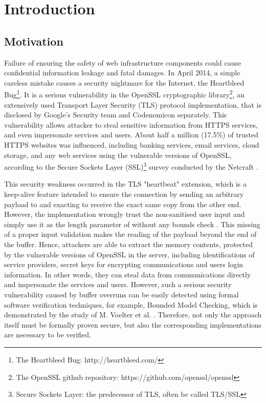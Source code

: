 
\chapter{Introduction}

\section{Motivation} \label{sec:heartbleed bug}
Failure of ensuring the safety of web infrastructure components could cause confidential information leakage and fatal damages. In April 2014, a simple careless mistake causes a security nightmare for the Internet, the Heartbleed Bug\footnote{The Heartbleed Bug: http://heartbleed.com/}. It is a serious vulnerability in the OpenSSL cryptographic library\footnote{The OpenSSL github repository: https://github.com/openssl/openssl}, an extensively used Transport Layer Security (TLS) protocol implementation, that is disclosed by Google's Security team and Codenomicon separately. This vulnerability allows attacker to steal sensitive information from HTTPS services, and even impersonate services and users. About half a million (17.5\%) of trusted HTTPS websites was influenced, including banking services, email services, cloud storage, and any web services using the vulnerable versions of OpenSSL, according to the Secure Sockets Layer (SSL)\footnote{Secure Sockets Layer: the predecessor of TLS, often be called TLS/SSL} survey conducted by the Netcraft \cite{9_heartbleed}.

This security weakness occurred in the TLS "heartbeat" extension, which is a keep-alive feature intended to ensure the connection by sending an arbitrary payload to and exacting to receive the exact same copy from the other end. However, the implementation wrongly trust the non-sanitised user input and simply use it as the length parameter of  without any bounds check \cite{6_heartbleed_bug}. This missing of a proper input validation makes the reading of the payload beyond the end of the buffer. Hence, attackers are able to extract the memory contents, protected by the vulnerable versions of OpenSSL in the server, including identifications of service providers, secret keys for encrypting communications and users login information. In other words, they can steal data from communications directly and impersonate the services and users. However, such a serious security vulnerability caused by buffer overruns can be easily detected using formal software verification techniques, for example, Bounded Model Checking, which is demonstrated by the study of M. Voelter et al. \cite{Voelter:2015:TIS:2846696.2846698}. Therefore, not only the approach itself must be formally proven secure, but also the corresponding implementations are necessary to be verified.

